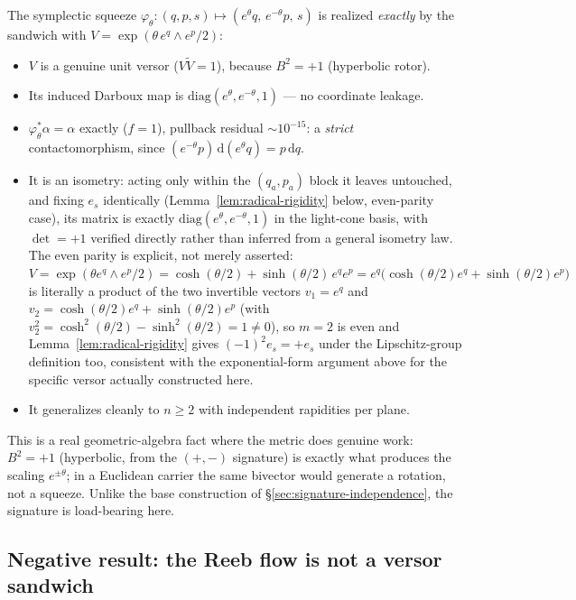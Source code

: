 \documentclass[11pt]{article}
\newcommand{\dif}{\mathrm{d}}
\begin{document}
The symplectic squeeze $\varphi_\theta:(q,p,s)\mapsto(e^\theta q,\,e^{-\theta}p,\,s)$ is realized \emph{exactly} by the sandwich with $V=\exp(\theta\,e^q\wedge e^p/2)$:
\begin{itemize}[leftmargin=1.4em]
\item $V$ is a genuine unit versor ($V\tilde V=1$), because $B^2=+1$ (hyperbolic rotor).
\item Its induced Darboux map is $\mathrm{diag}(e^\theta,e^{-\theta},1)$ — no coordinate leakage.
\item $\varphi_\theta^*\alpha=\alpha$ exactly ($f=1$), pullback residual $\sim10^{-15}$: a \emph{strict} contactomorphism, since $(e^{-\theta}p)\,\dif(e^\theta q)=p\,\dif q$.
\item It is an isometry: acting only within the $(q_a,p_a)$ block it leaves untouched, and fixing $e_s$ identically (Lemma~\ref{lem:radical-rigidity} below, even-parity case), its matrix is exactly $\mathrm{diag}(e^\theta,e^{-\theta},1)$ in the light-cone basis, with $\det=+1$ verified directly rather than inferred from a general isometry law. The even parity is explicit, not merely asserted: $V=\exp(\theta e^q\wedge e^p/2)=\cosh(\theta/2)+\sinh(\theta/2)\,e^qe^p=e^q\big(\cosh(\theta/2)e^q+\sinh(\theta/2)e^p\big)$ is literally a product of the two invertible vectors $v_1=e^q$ and $v_2=\cosh(\theta/2)e^q+\sinh(\theta/2)e^p$ (with $v_2^2=\cosh^2(\theta/2)-\sinh^2(\theta/2)=1\ne0$), so $m=2$ is even and Lemma~\ref{lem:radical-rigidity} gives $(-1)^2e_s=+e_s$ under the Lipschitz-group definition too, consistent with the exponential-form argument above for the specific versor actually constructed here.
\item It generalizes cleanly to $n\ge2$ with independent rapidities per plane.
\end{itemize}
This is a real geometric-algebra fact where the metric does genuine work: $B^2=+1$ (hyperbolic, from the $(+,-)$ signature) is exactly what produces the scaling $e^{\pm\theta}$; in a Euclidean carrier the same bivector would generate a rotation, not a squeeze. Unlike the base construction of \S\ref{sec:signature-independence}, the signature is load-bearing here.

\subsection{Negative result: the Reeb flow is not a versor sandwich}
\end{document}
